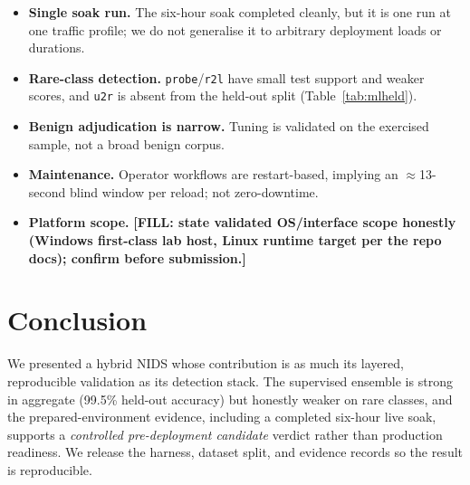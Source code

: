 \documentclass[11pt]{article}
\newcommand{\code}[1]{\texttt{#1}}
\newcommand{\FILL}[1]{\textbf{[FILL: #1]}}
\begin{document}
\begin{itemize}
  \item \textbf{Single soak run.} The six-hour soak completed cleanly, but it is
        one run at one traffic profile; we do not generalise it to arbitrary
        deployment loads or durations.
  \item \textbf{Rare-class detection.} \code{probe}/\code{r2l} have small test
        support and weaker scores, and \code{u2r} is absent from the held-out
        split (Table~\ref{tab:mlheld}).
  \item \textbf{Benign adjudication is narrow.} Tuning is validated on the
        exercised sample, not a broad benign corpus.
  \item \textbf{Maintenance.} Operator workflows are restart-based, implying an
        $\approx$13-second blind window per reload; not zero-downtime.
  \item \textbf{Platform scope.} \FILL{state validated OS/interface scope honestly
        (Windows first-class lab host, Linux runtime target per the repo docs);
        confirm before submission.}
\end{itemize}

\section{Conclusion}

We presented a hybrid NIDS whose contribution is as much its layered, reproducible
validation as its detection stack. The supervised ensemble is strong in aggregate
(99.5\% held-out accuracy) but honestly weaker on rare classes, and the
prepared-environment evidence, including a completed six-hour live soak, supports
a \emph{controlled pre-deployment candidate} verdict rather than production
readiness. We release the harness,
dataset split, and evidence records so the result is reproducible.
\end{document}
